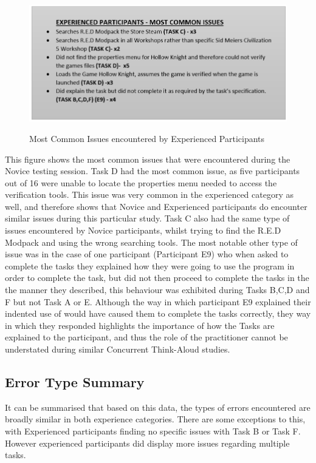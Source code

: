 \begin{figure}[H]
\includegraphics[width=\linewidth]{Screenshots/ErrorRecords/Experienced/experiencedCommonErrors.png}
\label{ExperiencedMostCommonErrors}
\caption{Most Common Issues encountered by Experienced Participants}
\end{figure}

This figure shows the most common issues that were encountered during the Novice testing session. Task D had the most common issue, as five participants out of 16 were unable to locate the properties menu needed to access the verification tools. This issue was very common in the experienced category as well, and therefore shows that Novice and Experienced participants do encounter similar issues during this particular study. Task C also had the same type of issues encountered by Novice participants, whilst trying to find the R.E.D Modpack and using the wrong searching tools. The most notable other type of issue was in the case of one participant (Participant E9) who when asked to complete the tasks they explained how they were going to use the program in order to complete the task, but did not then proceed to complete the tasks in the the manner they described, this behaviour was exhibited during Tasks B,C,D and F but not Task A or E. Although the way in which participant E9 explained their indented use of would have caused them to complete the tasks correctly, they way in which they responded highlights the importance of how the Tasks are explained to the participant, and thus the role of the practitioner cannot be understated during similar Concurrent Think-Aloud studies.

\subsection{Error Type Summary}
It can be summarised that based on this data, the types of errors encountered are broadly similar in both experience categories. There are some exceptions to this, with Experienced participants finding no specific issues with Task B or Task F. However experienced participants did display more issues regarding multiple tasks.


